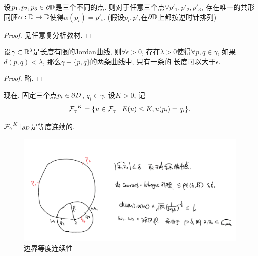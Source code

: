 \begin{lemma}\label{three_point}
    设$p_1,p_2,p_3  \in \partial \D$是三个不同的点. 则对于任意三个点$\forall p'_1, p'_2, p'_3$, 存在唯一的共形同胚$\alpha: \D \to \D$使得$\alpha(p_i)=p'_i$. (假设$p_i, p'_i$在$\P \D$上都按逆时针排列)
\end{lemma}
\begin{proof}
    见任意复分析教材.
\end{proof}
\begin{lemma}\label{cut_curves}
    设$\gamma \subset \R^3$是长度有限的Jordan曲线, 则$\forall \epsilon > 0$, 存在$\lambda>0$使得$\forall p,q \in \gamma$, 如果$d(p,q)< \lambda$, 那么$\gamma-\{p,q\}$的两条曲线中, 只有一条的
    长度可以大于$\epsilon$. 
\end{lemma}
\begin{proof}
    略.
\end{proof}
现在, 固定三个点$p_i \in \P D$, $q_i \in \gamma$. 设$K > 0$, 记
\begin{equation}
    \FG^K=\{u \in \FG\mid E(u) \le K, u(p_i)=q_i\}.
\end{equation}
\begin{lemma} \label{boundary_equicontinuous}
    $\FG^K\mid_{\P D}$是等度连续的.
\end{lemma}
\begin{figure}[ht]
    \centering
    \includegraphics[scale=0.6]{images/courant_lebesgue.png}
    \caption{边界等度连续性}
    \label{equi_continuous}
\end{figure}
